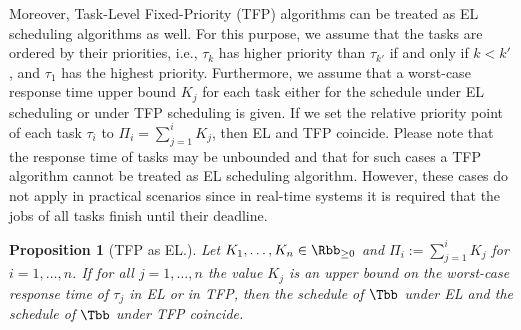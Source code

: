 \documentclass[conference]{IEEEtran}
\newtheorem{prop}[thm]{Proposition}
\theoremstyle{definition}
\theoremstyle{remark}
\begin{document}
Moreover, Task-Level Fixed-Priority (TFP) algorithms can be treated as EL scheduling algorithms as well.
For this purpose, we assume that the tasks are ordered by their priorities, i.e., $\tau_k$ has higher priority than $\tau_{k'}$ if and only if $k<k'$, and $\tau_1$ has the highest priority.
Furthermore, we assume that a worst-case response time upper bound $K_j$ for each task either for the schedule under EL scheduling or under TFP scheduling is given.
If we set the relative priority point of each task $\tau_i$ to $\Pi_i = \sum_{j=1}^{i} K_j$, then EL and TFP coincide.
Please note that the response time 
of tasks may be unbounded and that for such cases a TFP algorithm cannot be treated as EL scheduling algorithm.
However, these cases do not apply in practical scenarios since in real-time systems it is required that the jobs of all tasks finish until their deadline.

\begin{prop}[TFP as EL.]\label{prop:TFPasEL}
	Let $K_1, \dots, K_n \in \Rbb_{\geq 0}$ and $\Pi_i := \sum_{j=1}^{i} K_j$ for $i=1,\dots, n$.
	If for all $j=1,\dots, n$ the value $K_j$ is an upper bound on the worst-case response time of $\tau_j$ in EL or in TFP, then the schedule of $\Tbb$ under EL and the schedule of $\Tbb$ under TFP coincide.
\end{prop}
\end{document}
